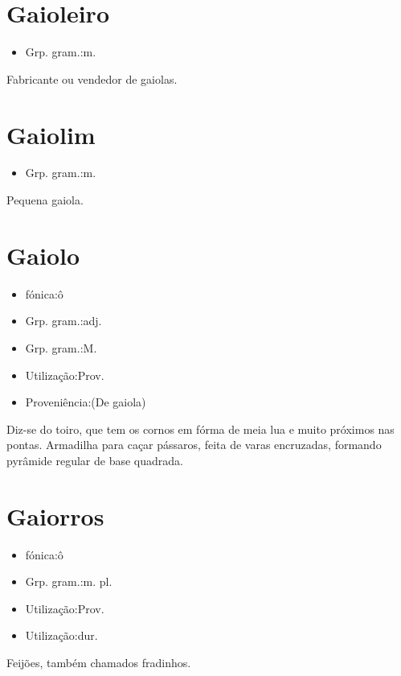 \section{Gaioleiro}
\begin{itemize}
\item {Grp. gram.:m.}
\end{itemize}
Fabricante ou vendedor de gaiolas.
\section{Gaiolim}
\begin{itemize}
\item {Grp. gram.:m.}
\end{itemize}
Pequena gaiola.
\section{Gaiolo}
\begin{itemize}
\item {fónica:ô}
\end{itemize}
\begin{itemize}
\item {Grp. gram.:adj.}
\end{itemize}
\begin{itemize}
\item {Grp. gram.:M.}
\end{itemize}
\begin{itemize}
\item {Utilização:Prov.}
\end{itemize}
\begin{itemize}
\item {Proveniência:(De \textunderscore gaiola\textunderscore )}
\end{itemize}
Diz-se do toiro, que tem os cornos em fórma de meia lua e muito próximos nas pontas.
Armadilha para caçar pássaros, feita de varas encruzadas, formando pyrâmide regular de base quadrada.
\section{Gaiorros}
\begin{itemize}
\item {fónica:ô}
\end{itemize}
\begin{itemize}
\item {Grp. gram.:m. pl.}
\end{itemize}
\begin{itemize}
\item {Utilização:Prov.}
\end{itemize}
\begin{itemize}
\item {Utilização:dur.}
\end{itemize}
Feijões, também chamados \textunderscore fradinhos\textunderscore .
